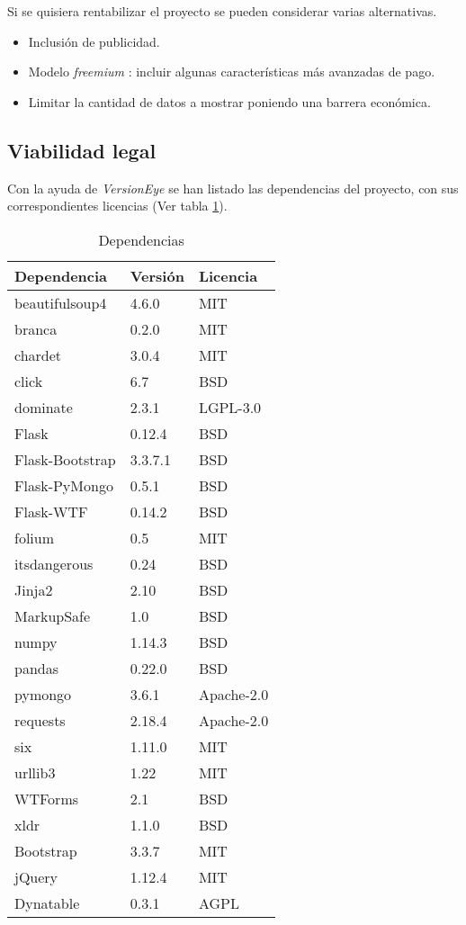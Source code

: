 Si se quisiera rentabilizar el proyecto se pueden considerar varias alternativas.

\begin{itemize}
	\item Inclusión de publicidad.
	\item Modelo \textit{freemium} \cite{wiki:freemium}: incluir algunas características más avanzadas de pago.
	\item Limitar la cantidad de datos a mostrar poniendo una barrera económica.
\end{itemize}

\subsection{Viabilidad legal}

Con la ayuda de \textit{VersionEye} \cite{misc:versioneye} se han listado las dependencias del proyecto, con sus correspondientes licencias (Ver tabla \ref{tab:dependencias}). 

\begin{table}[]
	\centering
	\begin{tabular}{lll}
		\hline
		Dependencia & Versión & Licencia \\ \hline
		beautifulsoup4 & 4.6.0 & MIT \\
		branca & 0.2.0& MIT \\
		chardet & 3.0.4 & MIT \\
		click & 6.7 & BSD \\
		dominate & 2.3.1 & LGPL-3.0 \\
		Flask & 0.12.4 & BSD \\
		Flask-Bootstrap & 3.3.7.1 & BSD \\
		Flask-PyMongo & 0.5.1 & BSD \\
		Flask-WTF & 0.14.2 & BSD \\
		folium & 0.5 & MIT \\
		itsdangerous & 0.24 & BSD \\
		Jinja2 & 2.10 & BSD \\
		MarkupSafe & 1.0 & BSD \\
		numpy & 1.14.3 & BSD \\
		pandas & 0.22.0 & BSD \\
		pymongo & 3.6.1 & Apache-2.0 \\
		requests & 2.18.4 & Apache-2.0 \\
		six & 1.11.0 & MIT \\
		urllib3 & 1.22 & MIT \\
		WTForms & 2.1 & BSD \\
		xldr & 1.1.0 & BSD \\
		Bootstrap & 3.3.7 & MIT \\
		jQuery & 1.12.4 & MIT \\
		Dynatable & 0.3.1 & AGPL \\
		\bottomrule
	\end{tabular}
	\caption{Dependencias}
	\label{tab:dependencias}
\end{table}

